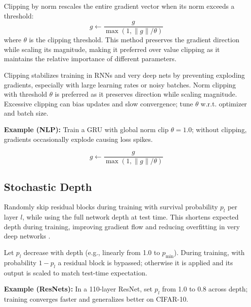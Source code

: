 \begin{definition}
Clipping by norm rescales the entire gradient vector when its norm exceeds a threshold:
\begin{equation}
g \leftarrow \frac{g}{\max(1, \|g\| / \theta)}
\end{equation}
where $\theta$ is the clipping threshold. This method preserves the gradient direction while scaling its magnitude, making it preferred over value clipping as it maintains the relative importance of different parameters.
\end{definition}

Clipping stabilizes training in RNNs and very deep nets by preventing exploding gradients, especially with large learning rates or noisy batches. Norm clipping with threshold $\theta$ is preferred as it preserves direction while scaling magnitude. Excessive clipping can bias updates and slow convergence; tune $\theta$ w.r.t. optimizer and batch size.

\begin{example}
\textbf{Example (NLP):} Train a GRU with global norm clip $\theta=1.0$; without clipping, gradients occasionally explode causing loss spikes.
\end{example}
\begin{equation}
g \leftarrow \frac{g}{\max(1, \|g\| / \theta)}
\end{equation}

\subsection{Stochastic Depth}

Randomly skip residual blocks during training with survival probability $p_l$ per layer $l$, while using the full network depth at test time. This shortens expected depth during training, improving gradient flow and reducing overfitting in very deep networks \cite{Huang2016StochasticDepth}.

Let $p_l$ decrease with depth (e.g., linearly from 1.0 to $p_{\min}$). During training, with probability $1-p_l$ a residual block is bypassed; otherwise it is applied and its output is scaled to match test-time expectation.

\begin{example}
\textbf{Example (ResNets):} In a 110-layer ResNet, set $p_l$ from 1.0 to 0.8 across depth; training converges faster and generalizes better on CIFAR-10.
\end{example}


